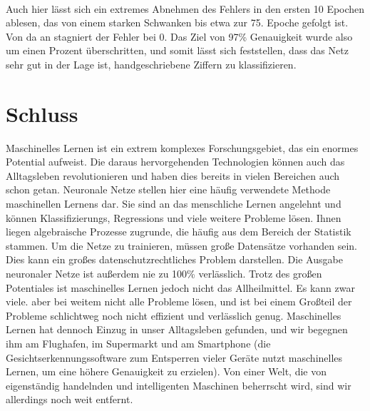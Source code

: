 \documentclass[11pt]{article}
\begin{document}
\\
Auch hier lässt sich ein extremes Abnehmen des Fehlers in den ersten 10 Epochen ablesen, das von einem starken Schwanken bis etwa zur 75. Epoche gefolgt ist. Von da an stagniert der Fehler bei 0. Das Ziel von 97\% Genauigkeit wurde also um einen Prozent überschritten, und somit lässt sich feststellen, dass das Netz sehr gut in der Lage ist, handgeschriebene Ziffern zu klassifizieren.
\section{Schluss}
Maschinelles Lernen ist ein extrem komplexes Forschungsgebiet, das ein enormes Potential aufweist. Die daraus hervorgehenden Technologien können auch das Alltagsleben revolutionieren und haben dies bereits in vielen Bereichen auch schon getan. Neuronale Netze stellen hier eine häufig verwendete Methode maschinellen Lernens dar. Sie sind an das menschliche Lernen angelehnt und können Klassifizierungs, Regressions und viele weitere Probleme lösen. Ihnen liegen algebraische Prozesse zugrunde, die häufig aus dem Bereich der Statistik stammen. Um die Netze zu trainieren, müssen große Datensätze vorhanden sein. Dies kann ein großes datenschutzrechtliches Problem darstellen. Die Ausgabe neuronaler Netze ist außerdem nie zu 100\% verlässlich. Trotz des großen Potentiales ist maschinelles Lernen jedoch nicht das Allheilmittel. Es kann zwar viele. aber bei weitem nicht alle Probleme lösen, und ist bei einem Großteil der  Probleme schlichtweg noch nicht effizient und verlässlich genug. Maschinelles Lernen hat dennoch Einzug in unser Alltagsleben gefunden, und wir begegnen ihm am Flughafen, im Supermarkt und am Smartphone (die Gesichtserkennungssoftware zum Entsperren vieler Geräte nutzt maschinelles Lernen, um eine höhere Genauigkeit zu erzielen). Von einer Welt, die von eigenständig handelnden und intelligenten Maschinen beherrscht wird, sind wir allerdings noch weit entfernt.
\newpage
\end{document}
